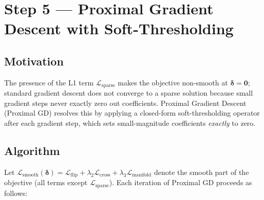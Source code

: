 \section{Step 5 — Proximal Gradient Descent with Soft-Thresholding}

\subsection{Motivation}

The presence of the L1 term $\mathcal{L}_{\text{sparse}}$ makes the objective non-smooth at $\boldsymbol{\delta} = \mathbf{0}$; standard gradient descent does not converge to a sparse solution because small gradient steps never exactly zero out coefficients. Proximal Gradient Descent (Proximal GD) resolves this by applying a closed-form soft-thresholding operator after each gradient step, which sets small-magnitude coefficients \emph{exactly} to zero.

\subsection{Algorithm}

Let $\mathcal{L}_{\text{smooth}}(\boldsymbol{\delta}) = \mathcal{L}_{\text{flip}} + \lambda_2 \mathcal{L}_{\text{cross}} + \lambda_3 \mathcal{L}_{\text{manifold}}$ denote the smooth part of the objective (all terms except $\mathcal{L}_{\text{sparse}}$). Each iteration of Proximal GD proceeds as follows:

